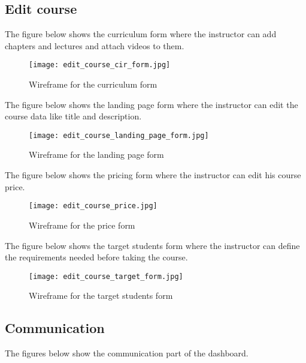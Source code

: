 \vfill
\clearpage

\subsection{Edit course}


The figure below shows the curriculum form where the instructor can add chapters and lectures and attach videos to them.

\begin{figure}[!ht]
    \centering
    \texttt{[image: edit\_course\_cir\_form.jpg]}
    \caption{Wireframe for the curriculum form}
    \label{fig:edit_course_cir_form}
\end{figure}

The figure below shows the landing page form where the instructor can edit the course data like title and description.

\begin{figure}[!ht]
    \centering
    \texttt{[image: edit\_course\_landing\_page\_form.jpg]}
    \caption{Wireframe for the landing page form}
    \label{fig:edit_course_landing_page_form}
\end{figure}

The figure below shows the pricing form where the instructor can edit his course price.

\begin{figure}[!ht]
    \centering
    \texttt{[image: edit\_course\_price.jpg]}
    \caption{Wireframe for the price form}
    \label{fig:edit_course_price}
\end{figure}

\vfill
\clearpage

The figure below shows the target students form where the instructor can define the requirements needed before taking the course.

\begin{figure}[!ht]
    \centering
    \texttt{[image: edit\_course\_target\_form.jpg]}
    \caption{Wireframe for the target students form}
    \label{fig:edit_course_target_form}
\end{figure}

\vfill
\clearpage

\subsection{Communication}

The figures below show the communication part of the dashboard.


